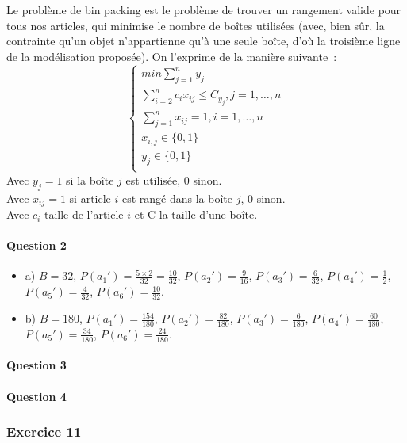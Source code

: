 \documentclass[a4paper, 12pt]{article}
\begin{document}
Le problème de bin packing est le problème de trouver un rangement
valide pour tous nos articles, qui minimise le nombre de boîtes
utilisées (avec, bien sûr, la contrainte qu'un objet n'appartienne
qu'à une seule boîte, d'où la troisième ligne de la modélisation
proposée).  On l'exprime de la manière suivante~:
\begin{equation}
\begin{cases}
min \sum_{j=1}^{n}y_j \\
\sum_{i=2}^{n} c_ix_{ij} \leq C_{y_j}, j = 1, \dots, n \\
\sum_{j=1}^{n}x_{ij}=1, i=1, \dots, n \\
x_{i,j} \in \{ 0,1 \} \\
y_j \in \{ 0,1 \} \\
\end{cases}
\end{equation}
Avec $y_j = 1$ si la boîte $j$ est utilisée, 0 sinon. \\
Avec $x_{ij} = 1 $ si article $i$ est rangé dans la boîte $j$, 0
sinon. \\
Avec $c_i$ taille de l'article $i$ et C la taille d'une boîte.


\paragraph{Question 2}
\begin{itemize}
\item a) $B = 32$, $P(a_1') = \frac{5 \times 2}{32} = \frac{10}{32}$,
  $P(a_2') = \frac{9}{16}$, $P(a_3')=\frac{6}{32}$,
  $P(a_4')=\frac{1}{2}$, $P(a_5')=\frac{4}{32}$, $P(a_6')=\frac{10}{32}$.
\item b) $B = 180$, $P(a_1') = \frac{154}{180}$,
  $P(a_2') = \frac{82}{180}$, $P(a_3')=\frac{6}{180}$,
  $P(a_4')=\frac{60}{180}$, $P(a_5')=\frac{34}{180}$, $P(a_6')=\frac{24}{180}$.
\end{itemize}

\paragraph{Question 3}

\paragraph{Question 4}

\subsubsection*{Exercice 11}
\end{document}
